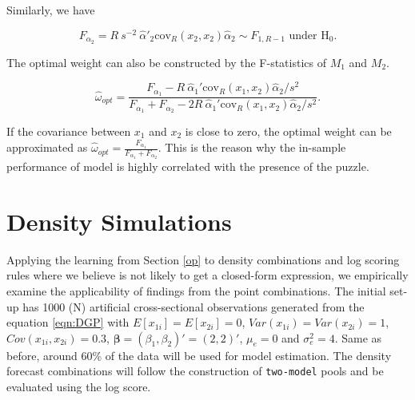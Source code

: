 \documentclass{monashthesis}
\begin{document}
Similarly, we have

\begin{equation*}
F_{\alpha_2} = R \ s^{-2} \ \hat\alpha'_2 \text{cov}_R(x_2,x_2) \hat\alpha_2 \sim F_{1,R-1} \text{ under  H}_0.
\end{equation*}

The optimal weight can also be constructed by the F-statistics of \(M_1\) and \(M_2\).

\begin{equation}
\hat\omega_{opt} = \frac{F_{\alpha_1}- R \ \hat\alpha_1'\text{cov}_R(x_1,x_2)\hat\alpha_2/s^2}{F_{\alpha_1} + F_{\alpha_2} - 2 R \ \hat\alpha_1'\text{cov}_R(x_1,x_2)\hat\alpha_2/s^2}.
\end{equation}

If the covariance between \(x_1\) and \(x_2\) is close to zero, the optimal weight can be approximated as \(\hat\omega_{opt} = \frac{F_{\alpha_1}}{F_{\alpha_1} + F_{\alpha_2}}\). This is the reason why the in-sample performance of model is highly correlated with the presence of the puzzle.

\hypertarget{density-simulations}{%
\section{Density Simulations}\label{density-simulations}}

Applying the learning from Section \ref{op} to density combinations and log scoring rules where we believe is not likely to get a closed-form expression, we empirically examine the applicability of findings from the point combinations. The initial set-up has 1000 (N) artificial cross-sectional observations generated from the equation \ref{eqn:DGP} with \(E[x_{1i}] = E[x_{2i}] = 0\), \(Var(x_{1i}) = Var(x_{2i}) = 1\), \(Cov(x_{1i}, x_{2i}) = 0.3\), \(\pmb{\beta} = (\beta_1, \beta_2)' = (2,2)'\), \(\mu_e = 0\) and \(\sigma^2_e=4\). Same as before, around 60\% of the data will be used for model estimation. The density forecast combinations will follow the construction of \texttt{two-model} pools and be evaluated using the log score.
\end{document}
